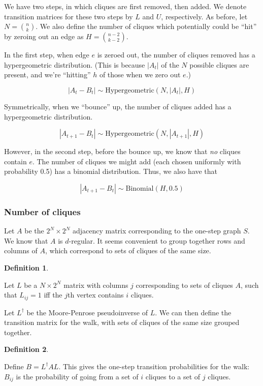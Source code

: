 \documentclass[12pt]{article}
\theoremstyle{definition}
\newtheorem{defn}{Definition}[section]
\begin{document}
We have two steps, in which cliques are first removed, then added.
We denote transition matrices for these two steps by $L$ and $U$, respectively.
As before, let $N = {n \choose k}$.
We also define the number of cliques which potentially could be ``hit'' by
zeroing out an edge as $H = {{n-2} \choose {k-2}}$.

In the first step, when edge $e$ is zeroed out, the number of cliques removed has
a hypergeometric distribution. (This is because $|A_t|$ of the $N$ possible cliques
are present, and we're ``hitting'' $h$ of those when we zero out $e$.)

\[
|A_t - B_t| \sim \text{Hypergeometric}(N, |A_t|, H)
\]

Symmetrically, when we ``bounce'' up, the number of cliques added has
a hypergeometric distribution.

\[
|A_{t+1} - B_t| \sim \text{Hypergeometric}(N, |A_{t+1}|, H)
\]

However, in the second step, before the bounce up, we know that {\em no} cliques contain $e$. The number of
cliques we might add (each chosen uniformly with probability 0.5) has 
a binomial distribution. Thus, we also have that

\[
|A_{t+1} - B_t| \sim \text{Binomial}(H, 0.5)
\]

\subsubsection{Number of cliques}

Let $A$ be the $2^N{\times}2^N$ adjacency matrix corresponding to the one-step graph $S$.
We know that $A$ is $d$-regular.
It seems convenient to group together rows and columns of $A$,
which correspond to sets of cliques of the same size.

\begin{defn} \label{defn:levels}

Let $L$ be a $N{\times}2^N$ matrix with columns $j$ corresponding to sets of cliques $A$, such that
$L_{ij} = 1$ iff the $j$th vertex contains $i$ cliques.

\end{defn}

Let $L^{\dagger}$ be the Moore-Penrose pseudoinverse of $L$.
We can then define the transition matrix for the walk, with sets of cliques of the same size grouped together.

\begin{defn} \label{defn:B}

Define
$B = L^{\dagger}AL$. This gives the one-step transition probabilities for the walk: $B_{ij}$ is the
probability of going from a set of $i$ cliques to a set of $j$ cliques.

\end{defn}
\end{document}
